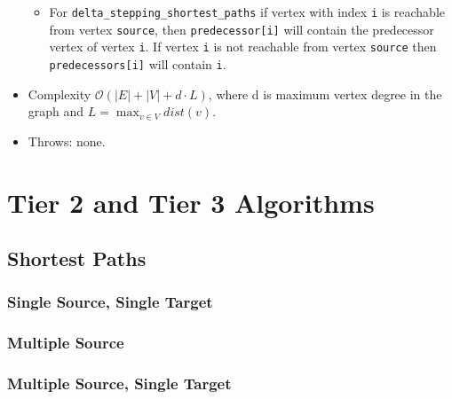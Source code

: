 \begin{itemize}
\begin{itemize}
\item[]
For \lstinline{delta_stepping_shortest_paths} if vertex with index \lstinline{i} is reachable
from vertex \lstinline{source}, then \lstinline{predecessor[i]} will contain the
predecessor vertex of vertex \lstinline{i}.  If vertex \lstinline{i} is not reachable
from vertex \lstinline{source} then \lstinline{predecessors[i]} will contain
\lstinline{i}.
\end{itemize}
%
\item[] Complexity $\mathcal{O}(|E| + |V| + d\cdot L)$, where d is maximum vertex degree in the graph and $L = \max_{v\in V} dist(v)$.
\item[] Throws: none. 
\end{itemize}







\section{Tier 2 and Tier 3 Algorithms}


\subsection{Shortest Paths}
\subsubsection{Single Source, Single Target}
\subsubsection{Multiple Source}
\subsubsection{Multiple Source, Single Target}

